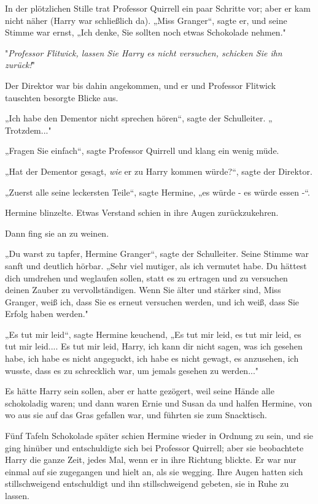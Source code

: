 {In der plötzlichen Stille trat Professor Quirrell ein paar Schritte vor; aber er kam nicht näher (Harry war schließlich da). „Miss Granger“, sagte er, und seine Stimme war ernst, „Ich denke, Sie sollten noch etwas Schokolade nehmen."

"\emph{Professor Flitwick, lassen Sie Harry es nicht versuchen, schicken Sie ihn zurück!}"

Der Direktor war bis dahin angekommen, und er und Professor Flitwick tauschten besorgte Blicke aus.

„Ich habe den Dementor nicht sprechen hören“, sagte der Schulleiter. „ Trotzdem..."

„Fragen Sie einfach“, sagte Professor Quirrell und klang ein wenig müde.

„Hat der Dementor gesagt, \emph{wie} er zu Harry kommen würde?“, sagte der Direktor.

„Zuerst alle seine leckersten Teile“, sagte Hermine, „es würde - es würde essen -“.

Hermine blinzelte. Etwas Verstand schien in ihre Augen zurückzukehren.

Dann fing sie an zu weinen.

„Du warst zu tapfer, Hermine Granger“, sagte der Schulleiter. Seine Stimme war sanft und deutlich hörbar. „Sehr viel mutiger, als ich vermutet habe. Du hättest dich umdrehen und weglaufen sollen, statt es zu ertragen und zu versuchen deinen Zauber zu vervollständigen. Wenn Sie älter und stärker sind, Miss Granger, weiß ich, dass Sie es erneut versuchen werden, und ich weiß, dass Sie Erfolg haben werden."

„Es tut mir leid“, sagte Hermine keuchend, „Es tut mir leid, es tut mir leid, es tut mir leid.... Es tut mir leid, Harry, ich kann dir nicht sagen, was ich gesehen habe, ich habe es nicht angeguckt, ich habe es nicht gewagt, es anzusehen, ich wusste, dass es zu schrecklich war, um jemals gesehen zu werden..."

Es hätte Harry sein sollen, aber er hatte gezögert, weil seine Hände alle schokoladig waren; und dann waren Ernie und Susan da und halfen Hermine, von wo aus sie auf das Gras gefallen war, und führten sie zum Snacktisch.

Fünf Tafeln Schokolade später schien Hermine wieder in Ordnung zu sein, und sie ging hinüber und entschuldigte sich bei Professor Quirrell; aber sie beobachtete Harry die ganze Zeit, jedes Mal, wenn er in ihre Richtung blickte. Er war nur einmal auf sie zugegangen und hielt an, als sie wegging. Ihre Augen hatten sich stillschweigend entschuldigt und ihn stillschweigend gebeten, sie in Ruhe zu lassen.

}
